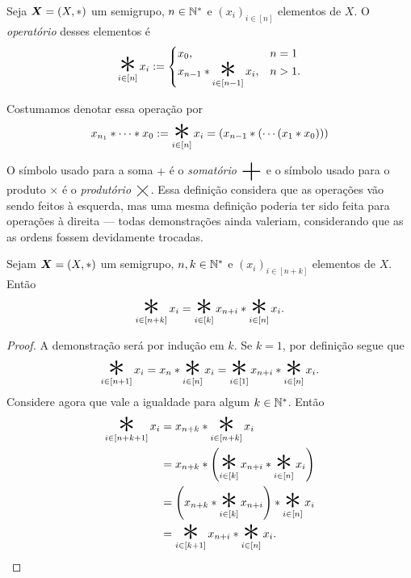 \begin{defi}
Seja $\bm X=(X,\ast)$ um semigrupo, $n \in \mathbb{N}^*$ e $(x_i)_{i \in [n]}$ elementos de $X$. O \emph{operatório} desses elementos é
	\begin{equation*}
	\bigopb _{i \in [n]} x_i :=
		\begin{cases}
		x_0, & n=1\\
		x_{n-1} \opb \displaystyle \bigopb_{i \in [n-1]} x_i, & n>1.
		\end{cases}
	\end{equation*}
\end{defi}

\begin{nota}
Costumamos denotar essa operação por
	\begin{equation*}
	x_{n_1} \opb \cdots \opb x_0 := \bigopb_{i \in [n]} x_i = (x_{n-1} \opb ( \cdots (x_1 \opb x_0)))
	\end{equation*}
\end{nota}

O símbolo usado para a soma $+$ é o \emph{somatório} $\displaystyle\bigplus$ e o símbolo usado para o produto $\times$ é o \emph{produtório} $\displaystyle\bigtimes$. Essa definição considera que as operações vão sendo feitos à esquerda, mas uma mesma definição poderia ter sido feita para operações à direita --- todas demonstrações ainda valeriam, considerando que as as ordens fossem devidamente trocadas.

\begin{prop}
Sejam $\bm X=(X,\ast)$ um semigrupo, $n,k \in \mathbb{N}^*$ e $(x_i)_{i \in [n+k]}$ elementos de $X$. Então
	\begin{equation*}
	\bigopb_{i \in [n+k]} x_i = \bigopb_{i \in [k]} x_{n+i} \opb \bigopb_{i \in [n]} x_i.
	\end{equation*}
\end{prop}
\begin{proof}
A demonstração será por indução em $k$. Se $k=1$, por definição segue que
	\begin{equation*}
	\bigopb_{i \in [n+1]} x_i = x_{n} \opb \displaystyle \bigopb_{i \in [n]} x_i = \bigopb_{i \in [1]} x_{n+i} \opb \bigopb_{i \in [n]} x_i.
	\end{equation*}
Considere agora que vale a igualdade para algum $k \in \mathbb{N}^*$. Então
	\begin{align*}
	\bigopb_{i \in [n+k+1]} x_i
		&= x_{n+k} \opb \bigopb_{i \in [n+k]} x_i \\
		&= x_{n+k} \opb \left(\bigopb_{i \in [k]} x_{n+i} \opb \bigopb_{i \in [n]} x_i\right) \\
		&= \left(x_{n+k} \opb \bigopb_{i \in [k]} x_{n+i} \right) \opb \bigopb_{i \in [n]} x_i \\
		&= \bigopb_{i \in [k+1]} x_{n+i} \opb \bigopb_{i \in [n]} x_i. \qedhere
	\end{align*}
\end{proof}

